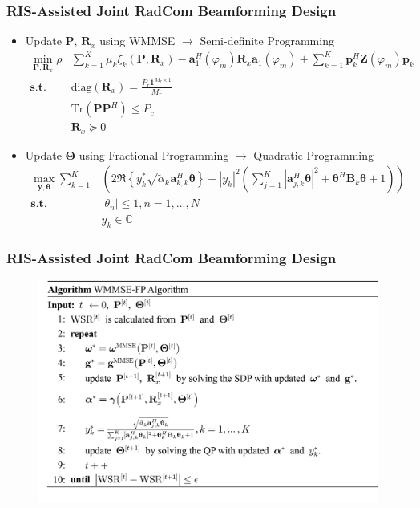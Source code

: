 \documentclass[9pt]{beamer}
\begin{document}
\begin{frame}
  \frametitle{RIS-Assisted Joint RadCom Beamforming Design}

  \begin{itemize}
    \item Update ${\mathbf{P}}$, ${\mathbf{R}}_x$ using WMMSE $\to$ Semi-definite Programming
      \begin{align*}
        \min_{\mathbf{P},\mathbf{R}_x} \rho&\sum_{k=1}^K \mu_k\xi_k(\mathbf{P},\mathbf{R}_x) - \mathbf{a}_1^H(\varphi_m)\mathbf{R}_x\mathbf{a}_1(\varphi_m) + \sum_{k=1}^K\mathbf{p}_k^H \mathbf{Z}(\varphi_m)\mathbf{p}_k
        \\ \mathbf{s.t.} \quad &\mathrm{diag}(\mathbf{R}_x) = \frac{P_r \mathbf{1}^{M_r \times 1}}{M_r} 
        \\ &\mathrm{Tr} (\mathbf{P}\mathbf{P}^H) \leq P_c 
        \\ &\mathbf{R}_x \succeq 0
      \end{align*}
    \item Update ${\mathbf{\Theta}}$ using Fractional Programming $\to$ Quadratic Programming 
      \begin{align*}
        \max_{\mathbf{y},\boldsymbol{\theta}} \sum_{k=1}^K&\left(2\mathfrak{R}\left\{y_k^*\sqrt{\tilde{\alpha}_k} \mathbf{a}_{k,k}^H \boldsymbol{\theta} \right\}-|y_k|^2\left(\sum_{j=1}^K|\mathbf{a}_{j,k}^H\boldsymbol{\theta} |^2 + \boldsymbol{\theta}^H \mathbf{B}_k \boldsymbol{\theta} + 1\right)\right) 
        \\  \mathbf{s.t.} \quad &|\theta_n| \leq 1,n=1,...,N 
        \\ &y_k \in \mathbb{C}
      \end{align*}
  \end{itemize}
\end{frame}


\begin{frame}
  \frametitle{RIS-Assisted Joint RadCom Beamforming Design}
  \begin{figure}
    \includegraphics[width=1\linewidth]{Fig6.png}
  \end{figure}

\end{frame}
\end{document}
